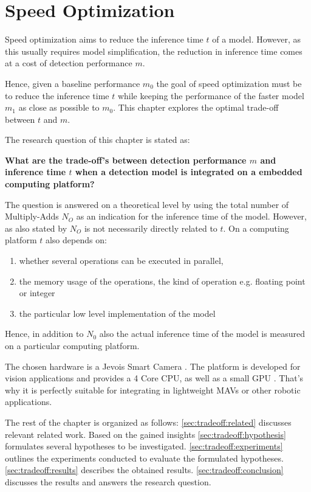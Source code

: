 \chapter{Speed Optimization}
\label{sec:tradeoff}

Speed optimization aims to reduce the inference time $t$ of a model. However, as this usually requires model simplification, the reduction in inference time comes at a cost of detection performance $m$.

Hence, given a baseline performance $m_0$ the goal of speed optimization must be to reduce the inference time $t$ while keeping the performance of the faster model $m_1$ as close as possible to $m_0$. This chapter explores the optimal trade-off between $t$ and $m$.


The research question of this chapter is stated as:

\begin{center}
	\textbf{What are the trade-off's between detection performance $m$ and inference time $t$ when a detection model is integrated on a embedded computing platform?}
\end{center}

The question is answered on a theoretical level by using the total number of \ac{Multiply-Adds} $N_O$ as an indication for the inference time of the model. However, as also stated by  $N_O$ is not necessarily directly related to $t$. On a computing platform $t$ also depends on:

\begin{enumerate}
	\item whether several operations can be executed in parallel,
	\item the memory usage of the operations, the kind of operation e.g. floating point or integer
	\item the particular low level implementation of the model
\end{enumerate} 

Hence, in addition to $N_0$ also the actual inference time of the model is measured on a particular computing platform.

The chosen hardware is a Jevois Smart Camera . The platform is developed for vision applications and provides a 4 Core CPU, as well as a small GPU . That's why it is perfectly suitable for integrating in lightweight \acp{MAV} or other robotic applications.

The rest of the chapter is organized as follows: \autoref{sec:tradeoff:related} discusses relevant related work. Based on the gained insights \autoref{sec:tradeoff:hypothesis} formulates several hypotheses to be investigated. \autoref{sec:tradeoff:experiments} outlines the experiments conducted to evaluate the formulated hypotheses. \autoref{sec:tradeoff:results} describes the obtained results. \autoref{sec:tradeoff:conclusion} discusses the results and answers the research question.



